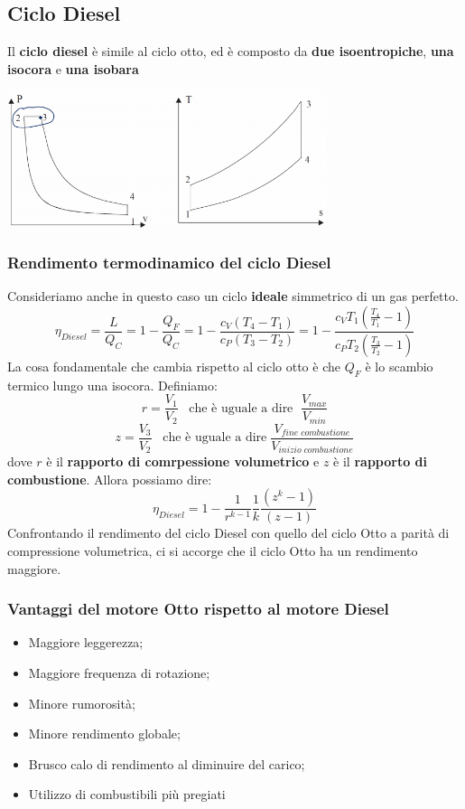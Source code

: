 \subsection{Ciclo Diesel}
Il \textbf{ciclo diesel} è simile al ciclo otto, ed è composto da \textbf{due isoentropiche}, \textbf{una isocora} e \textbf{una isobara}
\begin{center}
    \includegraphics[height=4cm]{../L07/img13.PNG}
\end{center}
\subsubsection{Rendimento termodinamico del ciclo Diesel}
Consideriamo anche in questo caso un ciclo \textbf{ideale} simmetrico di un gas perfetto.
\[
    \eta_{Diesel} = \frac{L}{Q_C} = 1- \frac{Q_F}{Q_C} = 1- \frac{c_V(T_4-T_1)}{c_P(T_3-T_2)} = 1- \frac{c_V T_1\left(\frac{T_4}{T_1}-1\right)}{c_P T_2 \left(\frac{T_3}{T_2}-1\right)}
\]
La cosa fondamentale che cambia rispetto al ciclo otto è che $Q_F$ è lo scambio termico lungo una isocora.\newline
Definiamo:
\[
    r = \frac{V_1}{V_2} \;\;\;\text{che è uguale a dire }\; \frac{V_{max}}{V_{min}}
\]
\[
    z = \frac{V_3}{V_2} \;\;\;\text{che è uguale a dire}\; \frac{V_{fine \; combustione}}{V_{inizio \; combustione}}
\]
dove $r$ è il \textbf{rapporto di comrpessione volumetrico} e $z$ è il \textbf{rapporto di combustione}.\newline
Allora possiamo dire:
\[
    \eta_{Diesel} = 1- \frac{1}{r^{k-1}} \frac{1}{k} \frac{(z^k -1)}{(z-1)}
\]
Confrontando il rendimento del ciclo Diesel con quello del ciclo Otto a parità di compressione volumetrica, ci si accorge che il ciclo Otto ha un rendimento maggiore.
\subsubsection{Vantaggi del motore Otto rispetto al motore Diesel}
\begin{itemize}
    \item Maggiore leggerezza;
    \item Maggiore frequenza di rotazione;
    \item Minore rumorosità;
    \item Minore rendimento globale;
    \item Brusco calo di rendimento al diminuire del carico;
    \item Utilizzo di combustibili più pregiati
\end{itemize}
